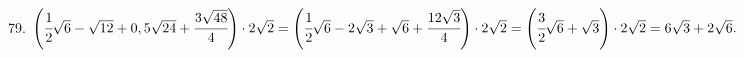 79. $\left(\cfrac{1}{2}\sqrt{6}-\sqrt{12}+0,5\sqrt{24}+\cfrac{3\sqrt{48}}{4}\right)\cdot2\sqrt{2}=
\left(\cfrac{1}{2}\sqrt{6}-2\sqrt{3}+\sqrt{6}+\cfrac{12\sqrt{3}}{4}\right)\cdot2\sqrt{2}=
\left(\cfrac{3}{2}\sqrt{6}+\sqrt{3}\right)\cdot2\sqrt{2}=6\sqrt{3}+2\sqrt{6}.$\\
